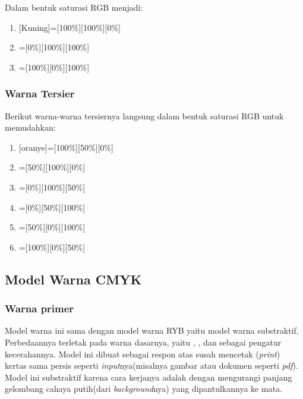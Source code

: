 \documentclass[a4paper]{article}
\newcommand{\warnalnbl}[1]{
  \tikz[baseline=-0.5\ht\strutbox]{
    \node[shape=rectangle, draw=black, fill=black, minimum height=1.5em, inner sep= 2pt, text=white]{#1}
  }
}
\begin{document}
Dalam bentuk saturasi RGB menjadi:
\begin{enumerate}
  \item {}[Kuning]=[100\%][100\%][0\%]
  \item {}=[0\%][100\%][100\%]
  \item {}=[100\%][0\%][100\%]
\end{enumerate}

\subsubsection{Warna Tersier}
Berikut warna-warna tersiernya langsung dalam bentuk saturasi RGB untuk memudahkan:
\begin{enumerate}
  \item {}[oranye]=[100\%][50\%][0\%]
  \item {}=[50\%][100\%][0\%]
  \item {}=[0\%][100\%][50\%]
  \item {}=[0\%][50\%][100\%]
  \item {}=[50\%][0\%][100\%]
  \item {}=[100\%][0\%][50\%]
\end{enumerate}

\subsection{Model Warna CMYK}
\subsubsection{Warna primer}
Model warna ini sama dengan model warna RYB yaitu model warna substraktif. Perbedaannya terletak pada warna dasarnya, yaitu , ,  dan \warnalnbl{Key/Black} sebagai pengatur kecerahannya. Model ini dibuat sebagai respon atas susah mencetak (\textit{print}) kertas sama persis seperti \textit{input}nya(misalnya gambar atau dokumen seperti \textit{pdf}). Model ini substraktif karena cara kerjanya adalah dengan mengurangi panjang gelombang cahaya putih(dari \textit{background}nya) yang dipantulkannya ke mata.
\end{document}
